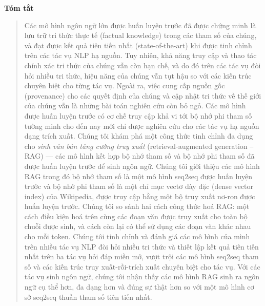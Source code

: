 \documentclass[10pt,letterpaper]{article}
\begin{document}
\vspace{0.1in}
\begin{center}{\large\bfseries Tóm tắt}\end{center}
\vspace{-4pt}
\begin{quote}
Các mô hình ngôn ngữ lớn được huấn luyện trước đã được chứng minh là lưu trữ
tri thức thực tế (factual knowledge) trong các tham số của chúng, và đạt được
kết quả tiên tiến nhất (state-of-the-art) khi được tinh chỉnh trên các tác vụ
NLP hạ nguồn. Tuy nhiên, khả năng truy cập và thao tác chính xác tri thức của
chúng vẫn còn hạn chế, và do đó trên các tác vụ đòi hỏi nhiều tri thức, hiệu
năng của chúng vẫn tụt hậu so với các kiến trúc chuyên biệt cho từng tác vụ.
Ngoài ra, việc cung cấp nguồn gốc (provenance) cho các quyết định của chúng và
cập nhật tri thức về thế giới của chúng vẫn là những bài toán nghiên cứu còn bỏ
ngỏ. Các mô hình được huấn luyện trước có cơ chế truy cập khả vi tới bộ nhớ phi
tham số tường minh cho đến nay mới chỉ được nghiên cứu cho các tác vụ hạ nguồn
dạng trích xuất. Chúng tôi khám phá một công thức tinh chỉnh đa dụng cho
\emph{sinh văn bản tăng cường truy xuất} (retrieval-augmented generation --
RAG) --- các mô hình kết hợp bộ nhớ tham số và bộ nhớ phi tham số đã được huấn
luyện trước để sinh ngôn ngữ. Chúng tôi giới thiệu các mô hình RAG trong đó bộ
nhớ tham số là một mô hình seq2seq được huấn luyện trước và bộ nhớ phi tham số
là một chỉ mục vectơ dày đặc (dense vector index) của Wikipedia, được truy cập
bằng một bộ truy xuất nơ-ron được huấn luyện trước. Chúng tôi so sánh hai cách
công thức hoá RAG: một cách điều kiện hoá trên cùng các đoạn văn được truy xuất
cho toàn bộ chuỗi được sinh, và cách còn lại có thể sử dụng các đoạn văn khác
nhau cho mỗi token. Chúng tôi tinh chỉnh và đánh giá các mô hình của mình trên
nhiều tác vụ NLP đòi hỏi nhiều tri thức và thiết lập kết quả tiên tiến nhất
trên ba tác vụ hỏi đáp miền mở, vượt trội các mô hình seq2seq tham số và các
kiến trúc truy xuất-rồi-trích xuất chuyên biệt cho tác vụ. Với các tác vụ sinh
ngôn ngữ, chúng tôi nhận thấy các mô hình RAG sinh ra ngôn ngữ cụ thể hơn, đa
dạng hơn và đúng sự thật hơn so với một mô hình cơ sở seq2seq thuần tham số
tiên tiến nhất.
\end{quote}

\end{document}
